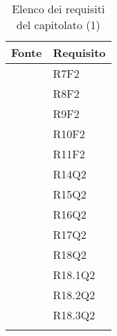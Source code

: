 		\begin{table}[H]
			\centering
			{\def\arraystretch{1.4}
			\begin{tabularx}{\textwidth}{YY}
				\textbf{Fonte} & \textbf{Requisito} \\
				\toprule
				 & R7F2 \\
				 & R8F2 \\
				 & R9F2 \\
				 & R10F2 \\
				 & R11F2 \\
				 & R14Q2 \\
				 & R15Q2 \\
				 & R16Q2 \\
				 & R17Q2 \\
				 & R18Q2 \\
				 & R18.1Q2 \\
				 & R18.2Q2 \\
				  & R18.3Q2 \\
				\bottomrule\\
			\end{tabularx}}
			\caption{Elenco dei requisiti del capitolato (1)}
		\end{table}

